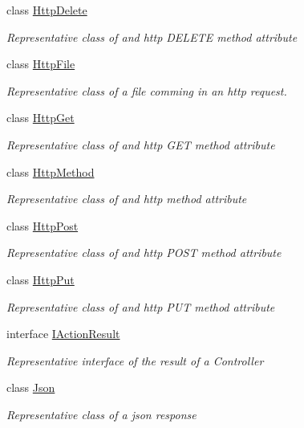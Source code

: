 \begin{DoxyCompactItemize}
class \hyperlink{class_mvc_1_1_http_delete}{Http\+Delete}
\begin{DoxyCompactList}\small\item\em Representative class of and http D\+E\+L\+E\+TE method attribute \end{DoxyCompactList}\item 
class \hyperlink{class_mvc_1_1_http_file}{Http\+File}
\begin{DoxyCompactList}\small\item\em Representative class of a file comming in an http request. \end{DoxyCompactList}\item 
class \hyperlink{class_mvc_1_1_http_get}{Http\+Get}
\begin{DoxyCompactList}\small\item\em Representative class of and http G\+ET method attribute \end{DoxyCompactList}\item 
class \hyperlink{class_mvc_1_1_http_method}{Http\+Method}
\begin{DoxyCompactList}\small\item\em Representative class of and http method attribute \end{DoxyCompactList}\item 
class \hyperlink{class_mvc_1_1_http_post}{Http\+Post}
\begin{DoxyCompactList}\small\item\em Representative class of and http P\+O\+ST method attribute \end{DoxyCompactList}\item 
class \hyperlink{class_mvc_1_1_http_put}{Http\+Put}
\begin{DoxyCompactList}\small\item\em Representative class of and http P\+UT method attribute \end{DoxyCompactList}\item 
interface \hyperlink{interface_mvc_1_1_i_action_result}{I\+Action\+Result}
\begin{DoxyCompactList}\small\item\em Representative interface of the result of a Controller \end{DoxyCompactList}\item 
class \hyperlink{class_mvc_1_1_json}{Json}
\begin{DoxyCompactList}\small\item\em Representative class of a json response \end{DoxyCompactList}\item 

\end{DoxyCompactItemize}
